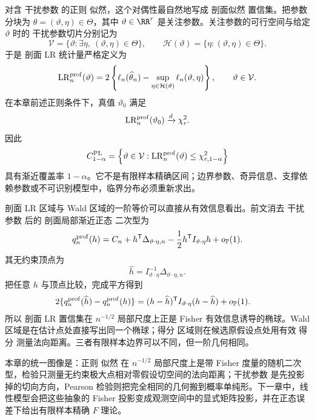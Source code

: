 \begin{definition}[剖面似然置信集]
对含 干扰参数 的正则 似然，这个对偶性最自然地写成 剖面似然 置信集。把参数分块为 $\theta=(\vartheta,\eta)\in\Theta$，其中 $\vartheta\in\RR^r$ 是关注参数。关注参数的可行空间与给定 $\vartheta$ 时的 干扰参数切片分别记为
\[
 \mathcal V
 =\{\vartheta:\exists\eta,\ (\vartheta,\eta)\in\Theta\},
 \qquad
 \mathcal H(\vartheta)
 =\{\eta:(\vartheta,\eta)\in\Theta\}.
\]
于是 剖面 LR 统计量严格定义为
\begin{equation*}\operatorname{LR}_n^{\rm prof}(\vartheta)
 =2\left\{
 \ell_n(\widehat\theta_n)
 -\sup_{\eta\in\mathcal H(\vartheta)}\ell_n(\vartheta,\eta)
 \right\},
 \qquad \vartheta\in\mathcal V.
\end{equation*}
在本章前述正则条件下，真值 $\vartheta_0$ 满足
\[
 \operatorname{LR}_n^{\rm prof}(\vartheta_0)\xrightarrow{d}\chi^2_r.
\]
因此
\begin{equation*}C^{\rm PL}_{1-\alpha}
 =\left\{
 \vartheta\in\mathcal V:
 \operatorname{LR}_n^{\rm prof}(\vartheta)\le\chi^2_{r,1-\alpha}
 \right\}
\end{equation*}
具有渐近覆盖率 $1-\alpha$。它不是有限样本精确区间；边界参数、奇异信息、支撑依赖参数或不可识别模型中，临界分布必须重新求出。
\end{definition}

\begin{proposition}[剖面 LR 与有效信息椭球]
剖面 LR 区域与 Wald 区域的一阶等价可以直接从有效信息看出。前文消去 干扰参数 后的 剖面局部渐近正态 二次型为
\[
 q_n^{\rm prof}(h)
 =C_n+h^{\mathsf T}\Delta_{\vartheta\cdot\eta,n}
 -\frac12h^{\mathsf T}I_{\vartheta\cdot\eta}h
 +o_{\mathbb P}(1).
\]
其无约束顶点为
\[
 \widehat h
 =I_{\vartheta\cdot\eta}^{-1}
 \Delta_{\vartheta\cdot\eta,n}.
\]
把任意 $h$ 与顶点比较，完成平方得到
\begin{align*}
 2\{q_n^{\rm prof}(\widehat h)-q_n^{\rm prof}(h)\}
 &=(h-\widehat h)^{\mathsf T}
 I_{\vartheta\cdot\eta}
 (h-\widehat h)
 +o_{\mathbb P}(1).
\end{align*}
所以 剖面 LR 置信集在 $n^{-1/2}$ 局部尺度上正是 Fisher 有效信息诱导的椭球。Wald 区域是在估计点处直接写出同一个椭球；得分 区域则在候选原假设点处用有效 得分 测量法向距离。三者有限样本边界可以不同，但一阶几何相同。
\end{proposition}

本章的统一图像是：正则 似然 在 $n^{-1/2}$ 局部尺度上是带 Fisher 度量的随机二次型，检验只测量无约束极大点相对零假设切空间的法向距离；干扰参数 是先投影掉的切向方向，Pearson 检验则把完全相同的几何搬到概率单纯形。下一章中，线性模型会把这些抽象的 Fisher 投影变成观测空间中的显式矩阵投影，并在正态误差下给出有限样本精确 $F$ 理论。








